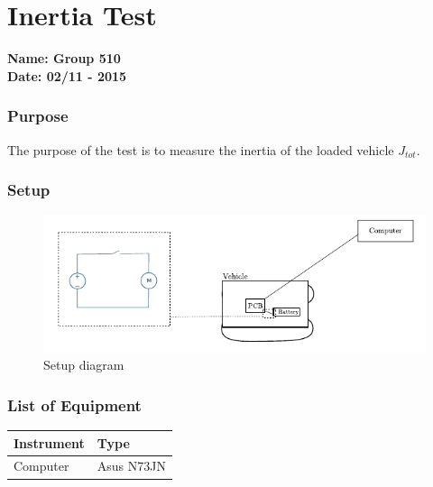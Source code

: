 \pagebreak
\section{Inertia Test}
\nopagebreak
\textbf{Name: Group 510}\\
\textbf{Date: 02/11 - 2015}

\subsubsection{Purpose}
The purpose of the test is to measure the inertia of the loaded vehicle $J_{tot}$.

\subsubsection{Setup}
\begin{figure}[H]
	\centering
	\includegraphics[scale=1.6]{figures/inertiaTestSetupDiagram.pdf}
	\caption{Setup diagram}
	\label{inertiaTestSetupDiagram}
\end{figure}

\subsubsection{List of Equipment}

\begin{table}[H]
\begin{tabular}{|p{10cm}|p{4cm}|}
\hline%
  \textbf{Instrument}                     &  \textbf{Type}       \\
\hline%
  Computer                                &  Asus N73JN    \\
\hline %
\end{tabular}
\end{table}


